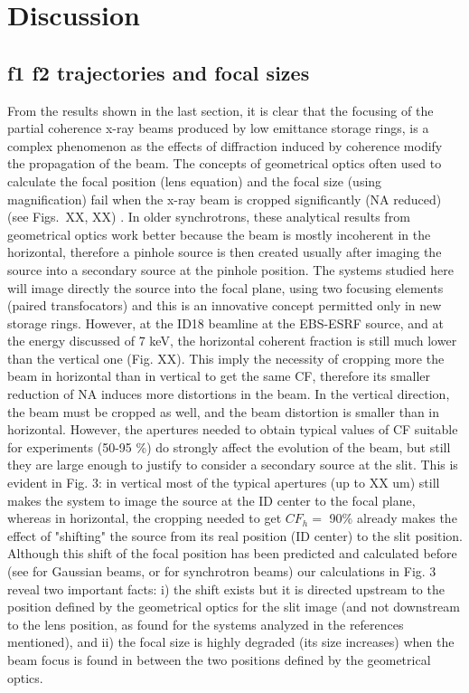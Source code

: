 \documentclass{iucr}              %
\begin{document}
\newpage


\section{Discussion}
\label{sec:discussion}

\subsection{f1 f2 trajectories and focal sizes} 

From the results shown in the last section, it is clear that the focusing of the partial coherence x-ray beams produced by low emittance storage rings, is a complex phenomenon as the effects of diffraction induced by coherence modify the propagation of the beam. The concepts of geometrical optics often used to calculate the focal position (lens equation) and the focal size (using magnification) fail when the x-ray beam is cropped significantly (NA reduced) (see Figs.~XX, XX) . In older synchrotrons, these analytical results from geometrical optics work better because the beam is mostly incoherent in the horizontal, therefore a pinhole source is then created usually after imaging the source into a secondary source at the pinhole position. The systems studied here will image directly the source into the focal plane, using two focusing elements (paired transfocators) and this is an innovative concept permitted only in new storage rings. However, at the ID18 beamline at the EBS-ESRF source, and at the energy discussed of 7 keV, the horizontal coherent fraction is still much lower than the vertical one (Fig. XX). This imply the necessity of cropping more the beam in horizontal than in vertical to get the same CF, therefore its smaller reduction of NA induces more distortions in the beam. In the vertical direction, the beam must be cropped as well, and the beam distortion is smaller than in horizontal. However, the apertures needed to obtain typical values of CF suitable for experiments (50-95 \%) do strongly affect the evolution of the beam, but still they are large enough to justify to consider a secondary source at the slit. 
This is evident in Fig. 3: in vertical most of the typical apertures (up to XX um) still makes the system to image the source at the ID center to the focal plane, whereas in horizontal, the cropping needed to get $CF_h=$ 90\% already makes the effect of "shifting" the source from its real position (ID center) to the slit position. Although this shift of the focal position has been predicted and calculated before (see \cite{tanaka} for Gaussian beams, or \cite{whej} for synchrotron beams) our calculations in Fig. 3 reveal two important facts: i) the shift exists but it is directed upstream to the position defined by the geometrical optics for the slit image (and not downstream to the lens position, as found for the systems analyzed in the references mentioned), and ii) the focal size is highly degraded (its size increases) when the beam focus is found in between the two positions defined by the geometrical optics.  
\end{document}
